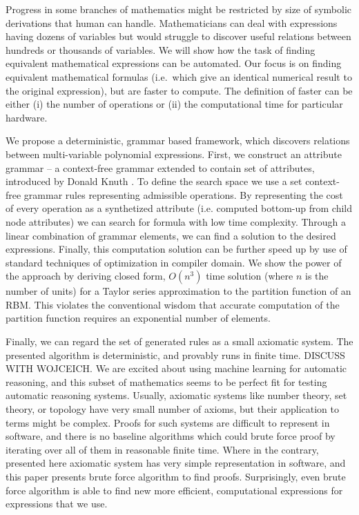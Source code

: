 Progress in some branches of
mathematics might be restricted by size of symbolic derivations that human can
handle.  Mathematicians can deal with expressions having dozens of
variables but would struggle to discover useful relations between hundreds or
thousands of variables. We will show how the task of finding equivalent
mathematical expressions can be automated. Our focus is on finding equivalent
mathematical formulas (i.e.~which give an identical numerical result
to the original expression),
but are faster to compute. The definition
of faster can be either (i) the number of operations or (ii) the computational time
for particular hardware.

We propose a deterministic, grammar based framework, which discovers
relations between multi-variable polynomial expressions. First, we
construct an attribute grammar -- a context-free grammar extended to
contain set of attributes, introduced by Donald Knuth
\cite{knuth1968semantics}. To define the search space we use a set
context-free grammar rules representing admissible operations. By
representing the cost of every operation as a synthetized attribute
(i.e. computed bottom-up from child node attributes) we can search for
formula with low time complexity.  Through a linear combination of
grammar elements, we can find a solution to the desired
expressions. Finally, this computation solution can be further speed
up by use of standard techniques of optimization in compiler
domain. We show the power of the approach by deriving closed form,
$O(n^3)$ time solution (where $n$ is the number of units) for a Taylor
series approximation to the partition function of an RBM. This
violates the conventional wisdom that accurate computation of the
partition function requires an exponential number of elements.


Finally, we can regard the set of generated rules as a small axiomatic system.
The presented algorithm is deterministic, and provably runs in finite
time. DISCUSS WITH WOJCEICH. We are excited about using machine learning for automatic reasoning, and
this subset of mathematics seems to be perfect fit for testing automatic reasoning systems.
Usually, axiomatic systems like number theory, set theory, or topology have very small
number of axioms, but their application to terms might be complex. Proofs
for such systems are difficult to represent in software, and there is no
baseline algorithms which could brute force proof by iterating over all of them in reasonable finite time.
Where in the contrary, presented here axiomatic system has very simple representation
in software, and this paper presents brute force algorithm to find proofs. 
Surprisingly, even brute force algorithm is able to find new more efficient,
computational expressions for expressions that we use.




